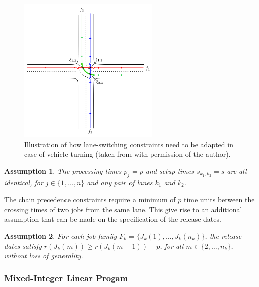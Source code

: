 \documentclass{article}
\theoremstyle{definition}
\theoremstyle{plain}
\newtheorem{assump}{Assumption}[section]
\begin{document}
\begin{figure}
  \centering
  \includegraphics[width=0.6\textwidth]{figures/Limpens-turning.png}
  \caption{Illustration of how lane-switching constraints need to be adapted in case of vehicle turning (taken from \cite{limpensOnlinePlatoonForming2023} with permission of the author).}
  \label{fig:limpens-turning}
\end{figure}

\begin{assump}
  \label{assump1}
  The processing times $p_{j} = p$ and setup times $s_{k_{1},k_{2}} = s$ are all
  identical, for $j \in \{1, \dots, n\}$ and any pair of lanes $k_{1}$ and
  $k_{2}$.
\end{assump}

The chain precedence constraints require a minimum of $p$ time units between the
crossing times of two jobs from the same lane. This give rise to an additional
assumption that can be made on the specification of the release dates.

\begin{assump}
  \label{assump2}
  For each job family $F_{k} = \{ J_{k}(1) , \dots, J_{k}(n_{k}) \}$, the release
  dates satisfy $r(J_{k}(m)) \geq r(J_{k}(m-1)) + p$, for all
  $m \in \{2, \dots, n_{k}\}$, without loss of generality.
\end{assump}


\subsubsection{Mixed-Integer Linear Progam}
\label{sec:single-MILP}
\end{document}
